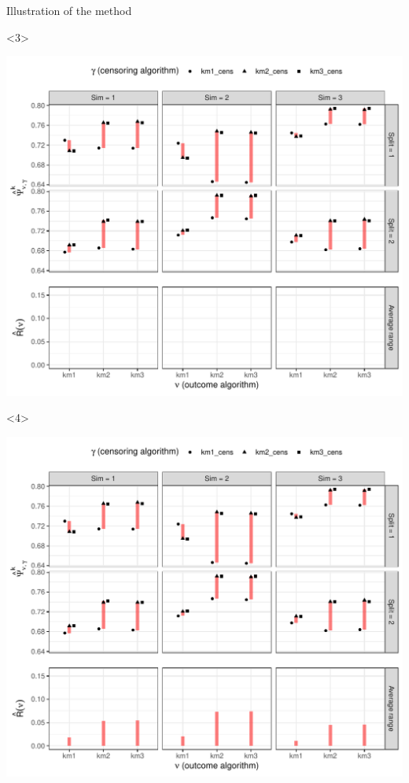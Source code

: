 \documentclass[smaller]{beamer}\usepackage{listings}
\begin{document}
\begin{frame}[label={sec:org1a3628f},fragile]{Illustration of the method}
\begin{onlyenv}
\begin{onlyenv}<3>
\begin{center}
\includegraphics[width=.9\linewidth]{fig-illustrate-fluct-risk2.pdf}
\end{center}
\end{onlyenv}

\begin{onlyenv}<4>
\begin{center}
\includegraphics[width=.9\linewidth]{fig-illustrate-fluct-risk3.pdf}
\end{center}
\end{onlyenv}
\end{onlyenv}
\end{frame}
\end{document}
